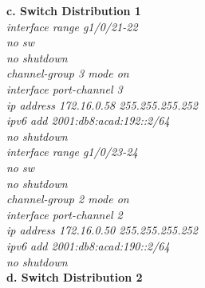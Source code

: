\documentclass[12pt,a4paper]{report}
\begin{document}
\hspace*{1cm}\textbf{c. Switch Distribution 1}\\
\hspace*{2cm}\textit{interface range g1/0/21-22\\
\hspace*{2cm}no sw\\
\hspace*{2cm}no shutdown\\
\hspace*{2cm}channel-group 3 mode on \\
\hspace*{2cm}interface port-channel 3\\
\hspace*{2cm}ip address 172.16.0.58 255.255.255.252\\
\hspace*{2cm}ipv6 add 2001:db8:acad:192::2/64\\
\hspace*{2cm}no shutdown\\
\hspace*{2cm}interface range g1/0/23-24\\
\hspace*{2cm}no sw\\
\hspace*{2cm}no shutdown\\
\hspace*{2cm}channel-group 2 mode on \\
\hspace*{2cm}interface port-channel 2\\
\hspace*{2cm}ip address 172.16.0.50 255.255.255.252\\
\hspace*{2cm}ipv6 add 2001:db8:acad:190::2/64\\
\hspace*{2cm}no shutdown\\}
\hspace*{1cm}\textbf{d. Switch Distribution 2}\\
\end{document}
